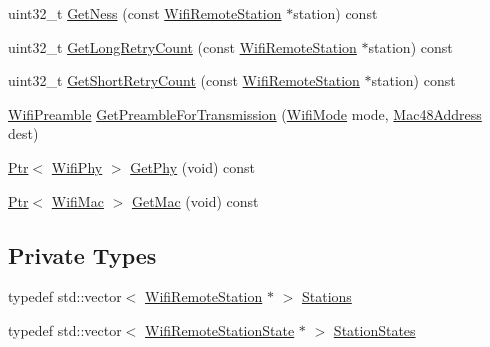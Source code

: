 \begin{DoxyCompactItemize}
\item 
uint32\+\_\+t \hyperlink{classns3_1_1WifiRemoteStationManager_aa764545f9d30b60f05ba8dc64f273d25}{Get\+Ness} (const \hyperlink{structns3_1_1WifiRemoteStation}{Wifi\+Remote\+Station} $\ast$station) const 
\item 
uint32\+\_\+t \hyperlink{classns3_1_1WifiRemoteStationManager_aac10b1403fb0bd670f8a8bd6d7e48304}{Get\+Long\+Retry\+Count} (const \hyperlink{structns3_1_1WifiRemoteStation}{Wifi\+Remote\+Station} $\ast$station) const 
\item 
uint32\+\_\+t \hyperlink{classns3_1_1WifiRemoteStationManager_ad61157a9a56cf668f3255730f6a416b2}{Get\+Short\+Retry\+Count} (const \hyperlink{structns3_1_1WifiRemoteStation}{Wifi\+Remote\+Station} $\ast$station) const 
\item 
\hyperlink{group__wifi_ga5e94a56cb338a14ffbbb19c6a41251eb}{Wifi\+Preamble} \hyperlink{classns3_1_1WifiRemoteStationManager_a0f44967cbd7488baada4802ebc642110}{Get\+Preamble\+For\+Transmission} (\hyperlink{classns3_1_1WifiMode}{Wifi\+Mode} mode, \hyperlink{classns3_1_1Mac48Address}{Mac48\+Address} dest)
\item 
\hyperlink{classns3_1_1Ptr}{Ptr}$<$ \hyperlink{classns3_1_1WifiPhy}{Wifi\+Phy} $>$ \hyperlink{classns3_1_1WifiRemoteStationManager_ab92b49cf78e0b72a51f5d13a1f15e242}{Get\+Phy} (void) const 
\item 
\hyperlink{classns3_1_1Ptr}{Ptr}$<$ \hyperlink{classns3_1_1WifiMac}{Wifi\+Mac} $>$ \hyperlink{classns3_1_1WifiRemoteStationManager_a1739d7dbfba0b5d9539ba840426dfb78}{Get\+Mac} (void) const 
\end{DoxyCompactItemize}
\subsection*{Private Types}
\begin{DoxyCompactItemize}
\item 
typedef std\+::vector$<$ \hyperlink{structns3_1_1WifiRemoteStation}{Wifi\+Remote\+Station} $\ast$ $>$ \hyperlink{classns3_1_1WifiRemoteStationManager_a7b768b3ab57de5bb047d594b8636be40}{Stations}
\item 
typedef std\+::vector$<$ \hyperlink{structns3_1_1WifiRemoteStationState}{Wifi\+Remote\+Station\+State} $\ast$ $>$ \hyperlink{classns3_1_1WifiRemoteStationManager_a22b074985212bd285e2d7a35dbe2a392}{Station\+States}
\end{DoxyCompactItemize}
